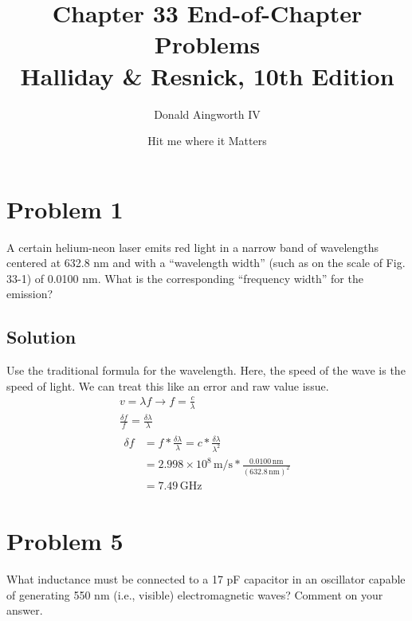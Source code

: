 \documentclass[12pt]{article}
\title{
    Chapter 33 End-of-Chapter Problems
    \\ \small
    Halliday \& Resnick, 10th Edition
}
\author{Donald Aingworth IV}
\date{\small Hit me where it Matters}
\newcommand{\E}[1]{\times 10^{#1}}
\begin{document}

    \maketitle

    \pagebreak
    \section{Problem 1}
        A certain helium-neon laser emits red light in a narrow band of wavelengths centered at 632.8 nm and with a “wavelength width” (such as on the scale of Fig. 33-1) of 0.0100 nm. 
        What is the corresponding “frequency width” for the emission?

        \subsection{Solution}
            Use the traditional formula for the wavelength.
            Here, the speed of the wave is the speed of light.
            We can treat this like an error and raw value issue.
            \begin{gather}
                v   =   \lambda f   \to
                f   =   \frac{c}{\lambda}\\
                \frac{\delta f}{f} = \frac{\delta \lambda}{\lambda}\\
                \begin{align}
                    \delta f    &=  f * \frac{\delta \lambda}{\lambda}
                        =   c * \frac{\delta \lambda}{\lambda^2}\\
                        &=  2.998\E{8}\,\unit{\meter/\second} * \frac{0.0100\,\unit{\nano\meter}}{(632.8\,\unit{\nano\meter})^2}\\
                        &=  \boxed{7.49\,\unit{\giga\hertz}}
                \end{align}
            \end{gather}

    \pagebreak
    \section{Problem 5}
        What inductance must be connected to a 17 pF capacitor in an oscillator capable of generating 550 nm (i.e., visible) electromagnetic waves? 
        Comment on your answer.
\end{document}

